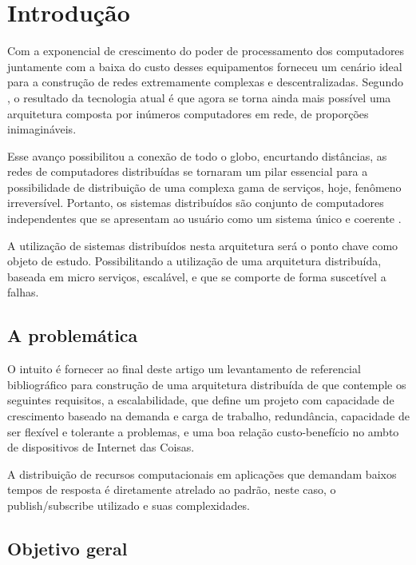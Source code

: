 
\chapter{\textbf{Introdução}} %

Com a exponencial de crescimento do poder de processamento dos computadores juntamente com a baixa do custo desses equipamentos forneceu um cenário ideal para a construção de redes extremamente complexas e descentralizadas. Segundo \cite{vanSteen1999}, o resultado da tecnologia atual é que agora se torna ainda mais possível uma arquitetura composta por inúmeros computadores em rede, de proporções inimagináveis.\par
Esse avanço possibilitou a conexão de todo o globo, encurtando distâncias, as redes de computadores distribuídas se tornaram um pilar essencial para a possibilidade de distribuição de uma complexa gama de serviços, hoje, fenômeno irreversível. Portanto, os sistemas distribuídos são conjunto de computadores independentes que se apresentam ao usuário como um sistema único e coerente \cite{vanSteen2016}. \par
A utilização de sistemas distribuídos nesta arquitetura será o ponto chave como objeto de estudo. Possibilitando a utilização de uma arquitetura distribuída, baseada em micro serviços, escalável, e que se comporte de forma suscetível a falhas.


\section{A problemática}
O intuito é fornecer ao final deste artigo um levantamento de referencial bibliográfico para construção de uma arquitetura distribuída de que contemple os seguintes requisitos, a escalabilidade, que define um projeto com capacidade de crescimento baseado na demanda e carga de trabalho, redundância, capacidade de ser flexível e tolerante a problemas, e uma boa relação custo-benefício no ambto de dispositivos de Internet das Coisas.\par 
A distribuição de recursos computacionais em aplicações que demandam baixos tempos de resposta é diretamente atrelado ao padrão, neste caso, o publish/subscribe utilizado e suas complexidades.\par


\iffalse
\section{Objetivo geral}


